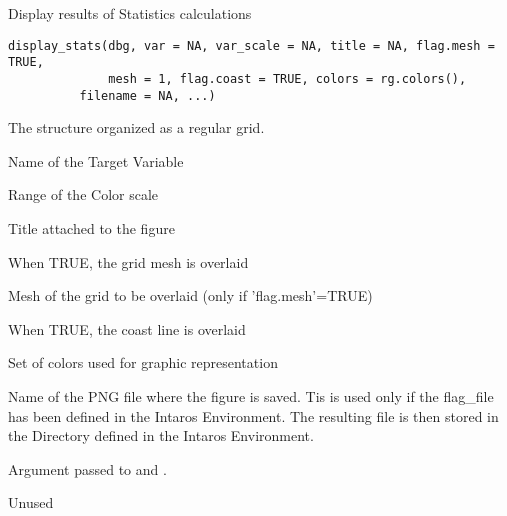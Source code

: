 %
\begin{Description}\relax
Display results of Statistics calculations
\end{Description}
%
\begin{Usage}
\begin{verbatim}
display_stats(dbg, var = NA, var_scale = NA, title = NA, flag.mesh = TRUE,
              mesh = 1, flag.coast = TRUE, colors = rg.colors(),
	      filename = NA, ...)
\end{verbatim}
\end{Usage}
%
\begin{Arguments}
\begin{ldescription}
\item[\code{dbg}] 
The  structure organized as a regular grid.

\item[\code{var}] 
Name of the Target Variable

\item[\code{var\_scale}] 
Range of the Color scale

\item[\code{title}] 
Title attached to the figure

\item[\code{flag.mesh}] 
When TRUE, the grid mesh is overlaid

\item[\code{mesh}] 
Mesh of the grid to be overlaid (only if 'flag.mesh'=TRUE)

\item[\code{flag.coast}] 
When TRUE, the coast line is overlaid

\item[\code{colors}] 
Set of colors used for graphic representation

\item[\code{filename}] 
Name of the PNG file where the figure is saved. Tis is used only if
the flag\_file has been defined in the Intaros Environment.
The resulting file is then stored in the Directory defined in the
Intaros Environment.

\item[\code{...}] 
Argument passed to  and
.

\end{ldescription}
\end{Arguments}
%
\begin{Value}
Unused
\end{Value}
